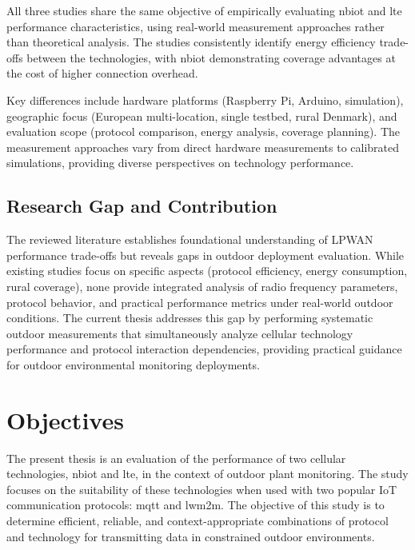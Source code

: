 \documentclass[12pt, english, openany]{book}
\begin{document}
All three studies share the same objective of empirically evaluating \gls{nbiot} and \gls{lte} performance characteristics, using real-world measurement approaches rather than theoretical analysis. The studies consistently identify energy efficiency trade-offs between the technologies, with \gls{nbiot} demonstrating coverage advantages at the cost of higher connection overhead.

Key differences include hardware platforms (Raspberry Pi, Arduino, simulation), geographic focus (European multi-location, single testbed, rural Denmark), and evaluation scope (protocol comparison, energy analysis, coverage planning). The measurement approaches vary from direct hardware measurements to calibrated simulations, providing diverse perspectives on technology performance.

\subsection{Research Gap and Contribution}

The reviewed literature establishes foundational understanding of LPWAN performance trade-offs but reveals gaps in outdoor deployment evaluation. While existing studies focus on specific aspects (protocol efficiency, energy consumption, rural coverage), none provide integrated analysis of radio frequency parameters, protocol behavior, and practical performance metrics under real-world outdoor conditions. The current thesis addresses this gap by performing systematic outdoor measurements that simultaneously analyze cellular technology performance and protocol interaction dependencies, providing practical guidance for outdoor environmental monitoring deployments.


\section{Objectives} \label{sec:objectives}

The present thesis is an evaluation of the performance of two cellular technologies, \gls{nbiot} and \gls{lte}, in the context of outdoor plant monitoring. The study focuses on the suitability of these technologies when used with two popular IoT communication protocols:  \gls{mqtt} and \gls{lwm2m}. The objective of this study is to determine efficient, reliable, and context-appropriate combinations of protocol and technology for transmitting data in constrained outdoor environments.
\end{document}
